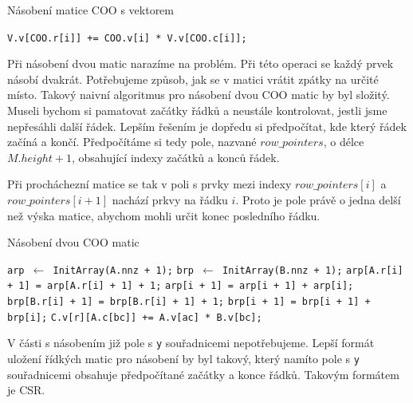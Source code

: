 \begin{algorithm}[H]
	\caption{Násobení matice COO s vektorem}\label{coo-mvm}
	\begin{algorithmic}[1]
			\State \texttt{V.v[COO.r[i]] += COO.v[i] * V.v[COO.c[i]];	}
		\EndFor
		\EndProcedure
	\end{algorithmic}
\end{algorithm}

\label{alg:coo-mmm}
Při násobení dvou matic narazíme na problém. Při této operaci se každý prvek násobí dvakrát. Potřebujeme způsob, jak se v matici vrátit zpátky na určité místo. Takový naivní algoritmus pro násobení dvou COO matic by byl složitý. Museli bychom si pamatovat začátky řádků a neustále kontrolovat, jestli jsme nepřesáhli další řádek. Lepším řešením je dopředu si předpočítat, kde který řádek začíná a končí. Předpočítáme si tedy pole, nazvané $row\_pointers$, o délce $M.height + 1$, obsahující indexy začátků a konců řádek.

Při procháchezní matice se tak v poli s prvky mezi indexy $row\_pointers[i]$ a $row\_pointers[i+1]$ nachází prkvy na řádku $i$. Proto je pole právě o jedna delší než výska matice, abychom mohli určit konec posledního řádku.

\begin{algorithm}[H]
	\caption{Násobení dvou COO matic}\label{coo-mmm}
	\begin{algorithmic}[1]
		\State \texttt{arp $\gets$ InitArray(A.nnz + 1);}
		\State \texttt{brp $\gets$ InitArray(B.nnz + 1);}
			\State \texttt{arp[A.r[i] + 1] = arp[A.r[i] + 1] + 1;}
		\EndFor
			\State \texttt{arp[i + 1] = arp[i + 1] + arp[i];}
		\EndFor
			\State \texttt{brp[B.r[i] + 1] = brp[B.r[i] + 1] + 1;}
		\EndFor
			\State \texttt{brp[i + 1] = brp[i + 1] + brp[i];}
		\EndFor
					\State \texttt{C.v[r][A.c[bc]] += A.v[ac] * B.v[bc];}
				\EndFor
			\EndFor
		\EndFor
		\EndProcedure
	\end{algorithmic}
\end{algorithm}

V části s násobením již pole s \texttt{y} souřadnicemi nepotřebujeme. Lepší formát uložení řídkých matic pro násobení by byl takový, který namíto pole s \texttt{y} souřadnicemi obsahuje předpočítané začátky a konce řádků. Takovým formátem je CSR.

